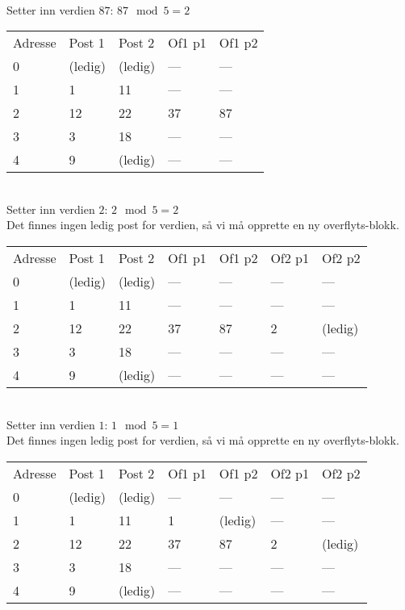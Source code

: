 ~\\
Setter inn verdien $87$: $87 \mod 5 = 2$\\
\begin{tabular}{|l|l|l|l|l|}
    \hline
    Adresse & Post 1 & Post 2 & Of1 p1 & Of1 p2 \\
    0       & (ledig)& (ledig)& ---   & ---   \\
    1       & 1      & 11     & ---   & ---   \\
    2       & 12     & 22     & 37     & 87     \\
    3       & 3      & 18     & ---   & ---   \\
    4       & 9      & (ledig)& ---   & ---   \\ \hline
\end{tabular}

~\\
Setter inn verdien $2$: $2 \mod 5 = 2$\\
Det finnes ingen ledig post for verdien, så vi må opprette en ny overflyts-blokk.\\
\begin{tabular}{|l|l|l|l|l|l|l|}
    \hline
    Adresse & Post 1 & Post 2 & Of1 p1 & Of1 p2 & Of2 p1 & Of2 p2 \\
    0       & (ledig)& (ledig)& ---   & ---   & ---   & ---   \\
    1       & 1      & 11     & ---   & ---   & ---   & ---   \\
    2       & 12     & 22     & 37     & 87     & 2      & (ledig)\\
    3       & 3      & 18     & ---   & ---   & ---   & ---   \\
    4       & 9      & (ledig)& ---   & ---   & ---   & ---   \\ \hline
\end{tabular}

~\\
Setter inn verdien $1$: $1 \mod 5 = 1$\\
Det finnes ingen ledig post for verdien, så vi må opprette en ny overflyts-blokk.\\
\begin{tabular}{|l|l|l|l|l|l|l|}
    \hline
    Adresse & Post 1 & Post 2 & Of1 p1 & Of1 p2 & Of2 p1 & Of2 p2 \\
    0       & (ledig)& (ledig)& ---   & ---   & ---   & ---   \\
    1       & 1      & 11     & 1      & (ledig)& ---   & ---   \\
    2       & 12     & 22     & 37     & 87     & 2      & (ledig)\\
    3       & 3      & 18     & ---   & ---   & ---   & ---   \\
    4       & 9      & (ledig)& ---   & ---   & ---   & ---   \\ \hline
\end{tabular}

